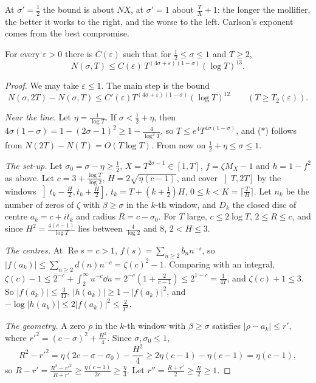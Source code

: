 At $\sigma'=\frac12$ the bound is about $NX$, at $\sigma'=1$ about $\frac TX+1$: the longer the mollifier, the better it works to the right, and the worse to the left. Carlson's exponent comes from the best compromise.

\begin{theorem}[Carlson, 1920]\label{thm:carlson}
For every $\varepsilon>0$ there is $C(\varepsilon)$ such that for $\frac12\le\sigma\le1$ and $T\ge2$,
\[
N(\sigma,T)\le C(\varepsilon)\,T^{(4\sigma+\varepsilon)(1-\sigma)}(\log T)^{13}.
\]
\end{theorem}

\begin{proof}
We may take $\varepsilon\le1$. The main step is the bound
\[
N(\sigma,2T)-N(\sigma,T)\le C'(\varepsilon)T^{(4\sigma+\varepsilon)(1-\sigma)}(\log T)^{12}\qquad(T\ge T_2(\varepsilon)).\tag{$*$}
\]

\emph{Near the line.} Let $\eta=\frac1{\log T}$. If $\sigma<\frac12+\eta$, then $4\sigma(1-\sigma)=1-(2\sigma-1)^2\ge1-\frac4{\log^2T}$, so $T\le e^4T^{4\sigma(1-\sigma)}$, and ($*$) follows from $N(2T)-N(T)=O(T\log T)$. From now on $\frac12+\eta\le\sigma\le1$.

\emph{The set-up.} Let $\sigma_0=\sigma-\eta\ge\frac12$, $X=T^{2\sigma-1}\in[1,T]$, $f=\zeta M_X-1$ and $h=1-f^2$ as above. Let $c=3+\frac{\log T}{\log2}$, $H=2\sqrt{\eta(c-1)}$, and cover $\left]T,2T\right]$ by the windows $\left]t_k-\frac H2,t_k+\frac H2\right]$, $t_k=T+(k+\frac12)H$, $0\le k<K=\lceil\frac TH\rceil$. Let $n_k$ be the number of zeros of $\zeta$ with $\beta\ge\sigma$ in the $k$-th window, and $D_k$ the closed disc of centre $a_k=c+it_k$ and radius $R=c-\sigma_0$. For $T$ large, $c\le2\log T$, $2\le R\le c$, and since $H^2=\frac{4(c-1)}{\log T}$ lies between $\frac4{\log 2}$ and $8$, $2<H\le3$.

\emph{The centres.} At $\operatorname{Re}s=c>1$, $f(s)=\sum_{n\ge2}b_nn^{-s}$, so $|f(a_k)|\le\sum_{n\ge2}d(n)n^{-c}=\zeta(c)^2-1$. Comparing with an integral, $\zeta(c)-1\le2^{-c}+\int_2^\infty u^{-c}\dd u=2^{-c}(1+\frac2{c-1})\le2^{1-c}=\frac1{4T}$, and $\zeta(c)+1\le3$. So $|f(a_k)|\le\frac3{4T}$, $|h(a_k)|\ge1-|f(a_k)|^2$, and
$-\log|h(a_k)|\le2|f(a_k)|^2\le\frac2{T^2}$.

\emph{The geometry.} A zero $\rho$ in the $k$-th window with $\beta\ge\sigma$ satisfies $|\rho-a_k|\le r'$, where $r'^2=(c-\sigma)^2+\frac{H^2}4$. Since $\sigma,\sigma_0\le1$,
\[
R^2-r'^2=\eta(2c-\sigma-\sigma_0)-\frac{H^2}4\ge2\eta(c-1)-\eta(c-1)=\eta(c-1),
\]
so $R-r'=\frac{R^2-r'^2}{R+r'}\ge\frac{\eta(c-1)}{2c}\ge\frac\eta3$. Let $r''=\frac{R+r'}2\ge\frac R2\ge1$.


\end{proof}

